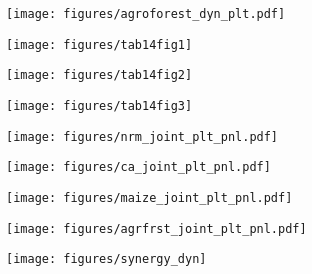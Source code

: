 \documentclass[11pt]{beamer}
\begin{document}
\begin{frame}
\label{agroforestdynplt}
\texttt{[image: figures/agroforest\_dyn\_plt.pdf]}
\hyperlink{frstpg}{}
\end{frame}


\begin{frame}
\label{tab14fig1}
\texttt{[image: figures/tab14fig1]}
\hyperlink{scndpg}{}
\end{frame}


\begin{frame}
\label{tab14fig2}
\texttt{[image: figures/tab14fig2]}
\hyperlink{scndpg}{}
\end{frame}


\begin{frame}
\label{tab14fig3}
\texttt{[image: figures/tab14fig3]}
\hyperlink{thrdpg}{}
\end{frame}


\begin{frame}
\label{nrmjointplt}
\texttt{[image: figures/nrm\_joint\_plt\_pnl.pdf]}
\hyperlink{frthpg}{}
\end{frame}

\begin{frame}
\label{cajointplt}
\texttt{[image: figures/ca\_joint\_plt\_pnl.pdf]}
\hyperlink{frthpg}{}
\end{frame}

\begin{frame}
\label{maizejointplt}
\texttt{[image: figures/maize\_joint\_plt\_pnl.pdf]}
\hyperlink{frthpg}{}
\end{frame}


\begin{frame}
\label{agrfrstjointplt}
\texttt{[image: figures/agrfrst\_joint\_plt\_pnl.pdf]}
\hyperlink{frthpg}{}
\end{frame}


\begin{frame}
\label{synergydyn}
\texttt{[image: figures/synergy\_dyn]}
\hyperlink{frthpg}{}
\end{frame}
\end{document}
